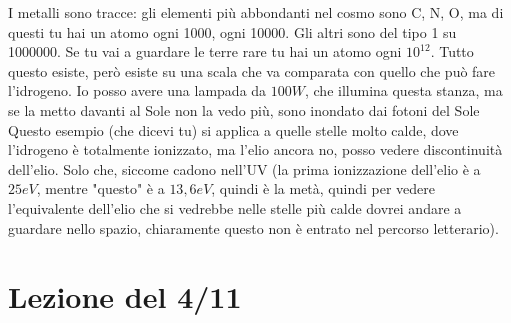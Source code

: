 \documentclass[a4paper,11pt]{article}
\begin{document}
I metalli sono tracce: gli elementi più abbondanti nel cosmo sono C, N, O, ma di questi tu hai un atomo ogni 1000, ogni 10000. Gli altri sono del tipo 1 su 1000000. Se tu vai a guardare le terre rare tu hai un atomo ogni $10^12$.
\newline
Tutto questo esiste, però esiste su una scala che va comparata con quello che può fare l'idrogeno. Io posso avere una lampada da $100W$, che illumina questa stanza, ma se la metto davanti al Sole non la vedo più, sono inondato dai fotoni del Sole
\newline
Questo esempio (che dicevi tu) si applica a quelle stelle molto calde, dove l'idrogeno è totalmente ionizzato, ma l'elio ancora no, posso vedere discontinuità dell'elio. Solo che, siccome cadono nell'UV (la prima ionizzazione dell'elio è a $25eV$, mentre "questo" è a $13,6eV$, quindi è la metà, quindi per vedere l'equivalente dell'elio che si vedrebbe nelle stelle più calde dovrei andare a guardare nello spazio, chiaramente questo non è entrato nel percorso letterario).
\newline

\newpage





\section{Lezione del 4/11}
\end{document}
